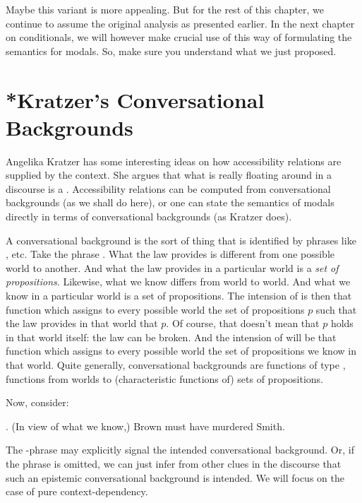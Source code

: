 Maybe this variant is more appealing. But for the rest of this chapter, we continue to assume the original analysis as presented earlier. In the next chapter on conditionals, we will however make crucial use of this way of formulating the semantics for modals. So, make sure you understand what we just proposed.

\section{*Kratzer's Conversational Backgrounds} \label{sec:kratz-conv-backgr}

Angelika Kratzer has some interesting ideas on how accessibility relations are supplied by the context. She argues that what is really floating around in a discourse is a . Accessibility relations can be computed from conversational backgrounds (as we shall do here), or one can state the semantics of modals directly in terms of conversational backgrounds (as Kratzer does).

A conversational background is the sort of thing that is identified by phrases like , etc. Take the phrase . What the law provides is different from one possible world to another. And what the law provides in a particular world is a \emph{set of propositions}. Likewise, what we know differs from world to world. And what we know in a particular world is a set of propositions. The intension of  is then that function which assigns to every possible world the set of propositions $p$ such that the law provides in that world that $p$. Of course, that doesn't mean that $p$ holds in that world itself: the law can be broken. And the intension of  will be that function which assigns to every possible world the set of propositions we know in that world. Quite generally, conversational backgrounds are functions of type , functions from worlds to (characteristic functions of) sets of propositions.

Now, consider:

\ex. (In view of what we know,) Brown must have murdered Smith.

The -phrase may explicitly signal the intended conversational background. Or, if the phrase is omitted, we can just infer from other clues in the discourse that such an epistemic conversational background is intended. We will focus on the case of pure context-dependency.

